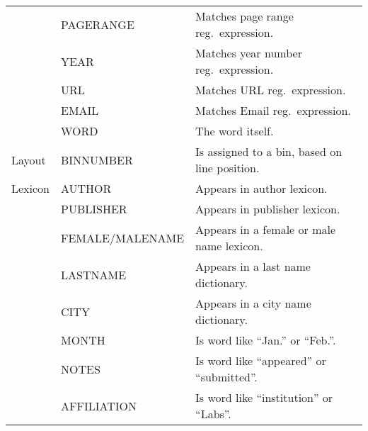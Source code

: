 {\begin{minipage}[c]{\linewidth}
\begin{tabular}{l l l}
          & PAGERANGE        & Matches page range reg.\ expression.\\
          & YEAR             & Matches year number reg.\ expression.\\
          & URL              & Matches URL reg.\ expression.\\
          & EMAIL            & Matches Email reg.\ expression.\\
          & WORD             & The word itself.\\
  \midrule
  Layout  & BINNUMBER        & Is assigned to a bin, based on line position.\\
  \midrule
  Lexicon & AUTHOR           & Appears in author lexicon.\\
          & PUBLISHER        & Appears in publisher lexicon.\\
          & FEMALE/MALENAME  & Appears in a female or male name lexicon.\\
          & LASTNAME         & Appears in a last name dictionary.\\
          & CITY             & Appears in a city name dictionary.\\
          & MONTH            & Is word like ``Jan.'' or ``Feb.''.\\
          & NOTES            & Is word like ``appeared'' or ``submitted''.\\
          & AFFILIATION      & Is word like ``institution'' or ``Labs''.\\
  \bottomrule
\end{tabular}
\label{tab:feature-descriptions}
\end{minipage}
}


